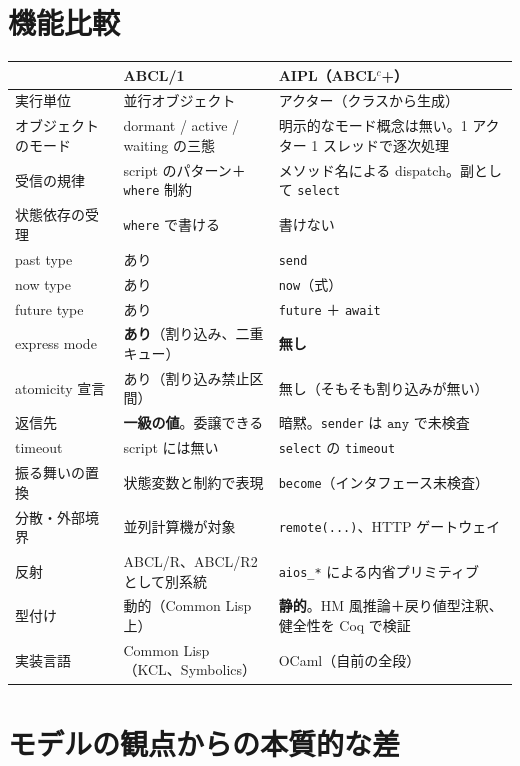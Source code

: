 \documentclass[11pt,a4paper]{ltjsarticle}
\theoremstyle{remark}
\newcommand{\ty}[1]{\ensuremath{\mathtt{#1}}}
\begin{document}
\section{機能比較}

\begin{center}
\small
\begin{tabular}{@{}lp{4.6cm}p{4.6cm}@{}}
\toprule
 & ABCL/1 & AIPL（ABCL$^{c}$+） \\
\midrule
実行単位 & 並行オブジェクト & アクター（クラスから生成） \\
オブジェクトのモード & dormant / active / waiting の三態 &
  明示的なモード概念は無い。1 アクター 1 スレッドで逐次処理 \\
受信の規律 & script のパターン＋\texttt{where} 制約 &
  メソッド名による dispatch。副として \texttt{select} \\
状態依存の受理 & \texttt{where} で書ける & 書けない \\
past type & あり & \texttt{send} \\
now type & あり & \texttt{now}（式） \\
future type & あり & \texttt{future} ＋ \texttt{await} \\
express mode & \textbf{あり}（割り込み、二重キュー） & \textbf{無し} \\
atomicity 宣言 & あり（割り込み禁止区間） & 無し（そもそも割り込みが無い） \\
返信先 & \textbf{一級の値}。委譲できる &
  暗黙。\texttt{sender} は \ty{any} で未検査 \\
timeout & script には無い & \texttt{select} の \texttt{timeout} \\
振る舞いの置換 & 状態変数と制約で表現 & \texttt{become}（インタフェース未検査）\\
分散・外部境界 & 並列計算機が対象 &
  \texttt{remote(...)}、HTTP ゲートウェイ \\
反射 & ABCL/R、ABCL/R2 として別系統 &
  \texttt{aios\_*} による内省プリミティブ \\
型付け & 動的（Common Lisp 上） &
  \textbf{静的}。HM 風推論＋戻り値型注釈、健全性を Coq で検証 \\
実装言語 & Common Lisp（KCL、Symbolics） & OCaml（自前の全段） \\
\bottomrule
\end{tabular}
\end{center}

\section{モデルの観点からの本質的な差}
\end{document}
